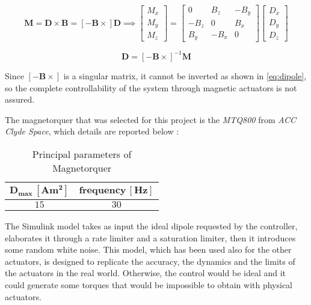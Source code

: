 \begin{equation}
    \boldsymbol{M} = \boldsymbol{D} \times \boldsymbol{B} =
	\left[ -\boldsymbol{B} \times \right] \boldsymbol{D}
	\implies
	\begin{bmatrix}
		M_x \\ M_y \\ M_z
	\end{bmatrix}
	=
	\begin{bmatrix}
		0 & B_z & -B_y \\
		-B_z & 0 & B_x \\
		B_y & -B_x & 0
	\end{bmatrix}
	\begin{bmatrix}
		D_x \\ D_y \\ D_z
	\end{bmatrix}
\end{equation}

\begin{equation} \label{eq:dipole}
	\boldsymbol{D} = \left[ -\boldsymbol{B} \times \right] ^{-1} \boldsymbol{M}
\end{equation}

Since $\left[ -\boldsymbol{B} \times \right]$ is a singular matrix, it cannot be inverted as shown in \autoref{eq:dipole}, so the complete controllability of the system through magnetic actuators is not assured.

The magnetorquer that was selected for this project is the \textit{MTQ800} from \textit{ACC Clyde Space}, which details are reported below \cite{magnetorquer_site}:
\begin{table}[H]

    \centering
    \begin{tabular}{|c|c|}
    \hline
    $\bm{D_{max} \, [Am^2]}$ & $\bm{frequency \, [Hz]}$ \\
    \hline
    $15$ & $30$ \\
    \hline
    \end{tabular}
    
    \caption{Principal parameters of Magnetorquer}
    \label{table:magnetorquer}
    
\end{table}

The Simulink model takes as input the ideal dipole requested by the controller, elaborates it through a rate limiter and a saturation limiter, then it introduces some random white noise. This model, which has been used also for the other actuators, is designed to replicate the accuracy, the dynamics and the limits of the actuators in the real world. Otherwise, the control would be ideal and it could generate some torques that would be impossible to obtain with physical actuators.


